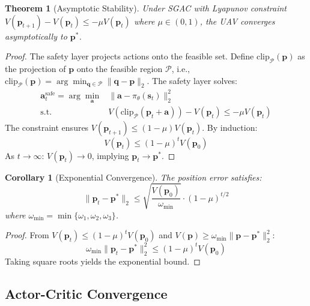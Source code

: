 \documentclass[journal]{IEEEtran}
\newtheorem{theorem}{Theorem}
\newtheorem{corollary}{Corollary}
\begin{document}
\begin{theorem}[Asymptotic Stability]
\label{thm:stability}
Under SGAC with Lyapunov constraint $V(\mathbf{p}_{t+1}) - V(\mathbf{p}_t) \leq -\mu V(\mathbf{p}_t)$ where $\mu \in (0,1)$, the UAV converges asymptotically to $\mathbf{p}^*$.
\end{theorem}

\begin{proof}
The safety layer projects actions onto the feasible set. Define $\text{clip}_\mathcal{P}(\mathbf{p})$ as the projection of $\mathbf{p}$ onto the feasible region $\mathcal{P}$, i.e., $\text{clip}_\mathcal{P}(\mathbf{p}) = \arg\min_{\mathbf{q} \in \mathcal{P}} \|\mathbf{q} - \mathbf{p}\|_2$. The safety layer solves:
\begin{align}
\mathbf{a}^{\text{safe}}_t = \arg\min_{\mathbf{a}} &\|\mathbf{a} - \pi_\theta(\mathbf{s}_t)\|_2^2 \\
\text{s.t. } &V(\text{clip}_\mathcal{P}(\mathbf{p}_t + \mathbf{a})) - V(\mathbf{p}_t) \leq -\mu V(\mathbf{p}_t) \nonumber
\end{align}
The constraint ensures $V(\mathbf{p}_{t+1}) \leq (1-\mu)V(\mathbf{p}_t)$. By induction:
\begin{equation}
V(\mathbf{p}_t) \leq (1-\mu)^t V(\mathbf{p}_0)
\end{equation}
As $t \to \infty$: $V(\mathbf{p}_t) \to 0$, implying $\mathbf{p}_t \to \mathbf{p}^*$.
\end{proof}

\begin{corollary}[Exponential Convergence]
\label{cor:exp}
The position error satisfies:
\begin{equation}
\|\mathbf{p}_t - \mathbf{p}^*\|_2 \leq \sqrt{\frac{V(\mathbf{p}_0)}{\omega_{\min}}} \cdot (1-\mu)^{t/2}
\end{equation}
where $\omega_{\min} = \min\{\omega_1, \omega_2, \omega_3\}$.
\end{corollary}

\begin{proof}
From $V(\mathbf{p}_t) \leq (1-\mu)^t V(\mathbf{p}_0)$ and $V(\mathbf{p}) \geq \omega_{\min}\|\mathbf{p} - \mathbf{p}^*\|_2^2$:
\begin{equation}
\omega_{\min}\|\mathbf{p}_t - \mathbf{p}^*\|_2^2 \leq (1-\mu)^t V(\mathbf{p}_0)
\end{equation}
Taking square roots yields the exponential bound.
\end{proof}

\subsection{Actor-Critic Convergence}
\end{document}

